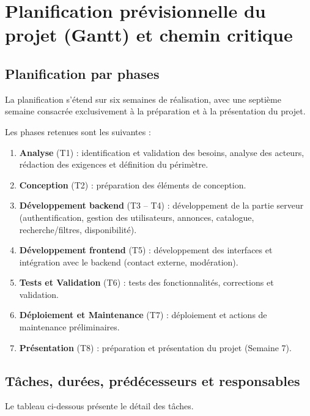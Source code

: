 ﻿\chapter{Planification prévisionnelle du projet (Gantt) et chemin critique}

\section{Planification par phases}

La planification s'étend sur six semaines de réalisation, avec une septième semaine consacrée exclusivement à la préparation et à la présentation du projet.

Les phases retenues sont les suivantes :

\begin{enumerate}
  \item \textbf{Analyse} (T1) : identification et validation des besoins, analyse des acteurs, rédaction des exigences et définition du périmètre.
  \item \textbf{Conception} (T2) : préparation des éléments de conception.
  \item \textbf{Développement backend} (T3 -- T4) : développement de la partie serveur (authentification, gestion des utilisateurs, annonces, catalogue, recherche/filtres, disponibilité).
  \item \textbf{Développement frontend} (T5) : développement des interfaces et intégration avec le backend (contact externe, modération).
  \item \textbf{Tests et Validation} (T6) : tests des fonctionnalités, corrections et validation.
  \item \textbf{Déploiement et Maintenance} (T7) : déploiement et actions de maintenance préliminaires.
  \item \textbf{Présentation} (T8) : préparation et présentation du projet (Semaine 7).
\end{enumerate}

\section{Tâches, durées, prédécesseurs et responsables}

Le tableau ci-dessous présente le détail des tâches.

